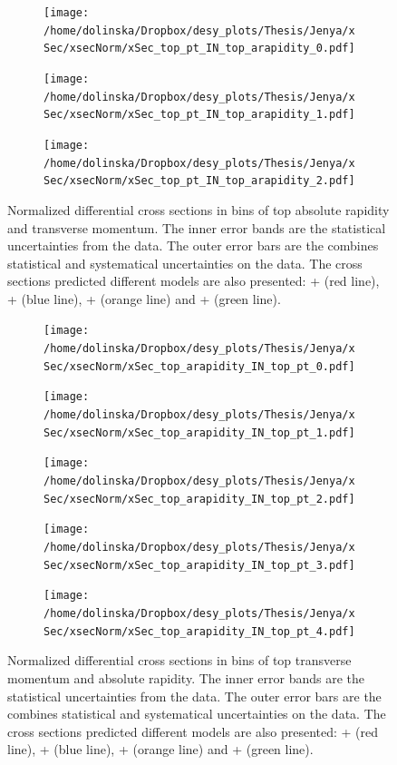 \begin{figure}[p]
\centering
\begin{subfigure}
  \centering
  \texttt{[image: /home/dolinska/Dropbox/desy\_plots/Thesis/Jenya/xSec/xsecNorm/xSec\_top\_pt\_IN\_top\_arapidity\_0.pdf]}
\end{subfigure}
\begin{subfigure}
  \centering
  \texttt{[image: /home/dolinska/Dropbox/desy\_plots/Thesis/Jenya/xSec/xsecNorm/xSec\_top\_pt\_IN\_top\_arapidity\_1.pdf]}
\end{subfigure}
\begin{subfigure}
  \centering
  \texttt{[image: /home/dolinska/Dropbox/desy\_plots/Thesis/Jenya/xSec/xsecNorm/xSec\_top\_pt\_IN\_top\_arapidity\_2.pdf]}
\end{subfigure}
\caption{Normalized differential cross sections in bins of top absolute rapidity and transverse momentum. The inner error bands are the statistical uncertainties from the data.
         The outer error bars are the combines statistical and systematical uncertainties on the data. The cross sections predicted different models are also presented:
         \MG + \PYTHIA (red line), \Powheg + \PYTHIA (blue line), \Powheg + \HERWIG (orange line) and \MCNLO + \HERWIG (green line).}
\label{fig:XS_2D_y_pt}
\end{figure}
\begin{figure}
\centering
\begin{subfigure}
  \centering
  \texttt{[image: /home/dolinska/Dropbox/desy\_plots/Thesis/Jenya/xSec/xsecNorm/xSec\_top\_arapidity\_IN\_top\_pt\_0.pdf]}
\end{subfigure}
\begin{subfigure}
  \centering
  \texttt{[image: /home/dolinska/Dropbox/desy\_plots/Thesis/Jenya/xSec/xsecNorm/xSec\_top\_arapidity\_IN\_top\_pt\_1.pdf]}
\end{subfigure}
\begin{subfigure}
  \centering
  \texttt{[image: /home/dolinska/Dropbox/desy\_plots/Thesis/Jenya/xSec/xsecNorm/xSec\_top\_arapidity\_IN\_top\_pt\_2.pdf]}
\end{subfigure}
\begin{subfigure}
  \centering
  \texttt{[image: /home/dolinska/Dropbox/desy\_plots/Thesis/Jenya/xSec/xsecNorm/xSec\_top\_arapidity\_IN\_top\_pt\_3.pdf]}
\end{subfigure}
\begin{subfigure}
  \centering
  \texttt{[image: /home/dolinska/Dropbox/desy\_plots/Thesis/Jenya/xSec/xsecNorm/xSec\_top\_arapidity\_IN\_top\_pt\_4.pdf]}
\end{subfigure}
\caption{Normalized differential cross sections in bins of top transverse momentum and absolute rapidity. The inner error bands are the statistical uncertainties from the data.
         The outer error bars are the combines statistical and systematical uncertainties on the data. The cross sections predicted different models are also presented:
         \MG + \PYTHIA (red line), \Powheg + \PYTHIA (blue line), \Powheg + \HERWIG (orange line) and \MCNLO + \HERWIG (green line).}
\label{fig:XS_2D_y_pt1}
\end{figure}

